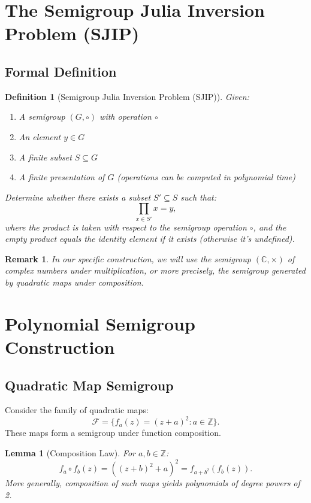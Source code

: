 \documentclass[11pt]{article}
\newtheorem{lemma}[theorem]{Lemma}
\newtheorem{definition}[theorem]{Definition}
\newtheorem{remark}[theorem]{Remark}
\begin{document}
\section{The Semigroup Julia Inversion Problem (SJIP)}

\subsection{Formal Definition}
\begin{definition}[Semigroup Julia Inversion Problem (SJIP)]
\label{def:sjip}
Given:
\begin{enumerate}
    \item A semigroup $(G, \circ)$ with operation $\circ$
    \item An element $y \in G$
    \item A finite subset $S \subseteq G$
    \item A finite presentation of $G$ (operations can be computed in polynomial time)
\end{enumerate}
Determine whether there exists a subset $S' \subseteq S$ such that:
\[
\prod_{x \in S'} x = y,
\]
where the product is taken with respect to the semigroup operation $\circ$, and the empty product equals the identity element if it exists (otherwise it's undefined).
\end{definition}

\begin{remark}
In our specific construction, we will use the semigroup $(\mathbb{C}, \times)$ of complex numbers under multiplication, or more precisely, the semigroup generated by quadratic maps under composition.
\end{remark}

\section{Polynomial Semigroup Construction}

\subsection{Quadratic Map Semigroup}
Consider the family of quadratic maps:
\[
\mathcal{F} = \{f_a(z) = (z + a)^2 : a \in \mathbb{Z}\}.
\]
These maps form a semigroup under function composition.

\begin{lemma}[Composition Law]
\label{lem:composition}
For $a, b \in \mathbb{Z}$:
\[
f_a \circ f_b(z) = ((z + b)^2 + a)^2 = f_{a + b^2}(f_b(z)).
\]
More generally, composition of such maps yields polynomials of degree powers of 2.
\end{lemma}
\end{document}
